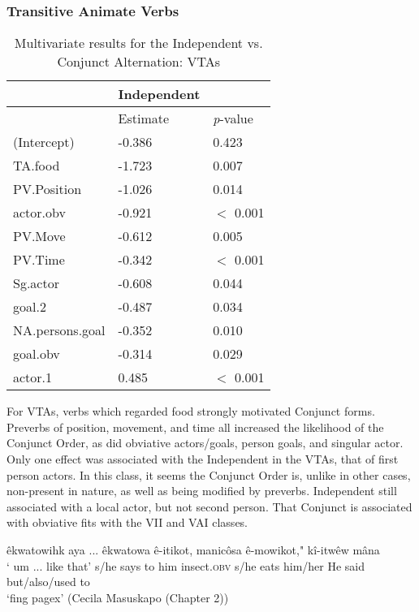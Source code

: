     \subsubsection{Transitive Animate Verbs}
        \begin{table}[H]
            \centering
            \begin{tabular}{lll}
    \toprule
            & \textbf{Independent} & \\
                    \midrule
            & Estimate & \textit{p}-value \\
    \midrule
(Intercept)     & -0.386 & 0.423 \\
TA.food         & -1.723 & 0.007 \\
PV.Position     & -1.026 & 0.014 \\
actor.obv       & -0.921 & $<$ 0.001 \\
PV.Move         & -0.612 & 0.005 \\
PV.Time         & -0.342 & $<$ 0.001\\
Sg.actor        & -0.608 & 0.044 \\
goal.2          & -0.487 & 0.034 \\
NA.persons.goal & -0.352 & 0.010 \\
goal.obv        & -0.314 & 0.029 \\
actor.1         & 0.485  & $<$ 0.001 \\
            \bottomrule
            \end{tabular}
            \caption{
               Multivariate results for the Independent vs. Conjunct Alternation: VTAs \\ \label{tab:taivcmv}
              }
            \end{table}
            
    For VTAs, verbs which regarded food strongly motivated Conjunct forms. Preverbs of position, movement, and time all increased the likelihood of the Conjunct Order, as did obviative actors/goals, person goals, and singular actor. Only one effect was associated with the Independent in the VTAs, that of first person actors. In this class, it seems the Conjunct Order is, unlike in other cases, non-present in nature, as well as being modified by preverbs. Independent still associated with a local actor, but not second person. That Conjunct is associated with obviative fits with the VII and VAI classes.
    
    \begin{exe}
    \ex
    \gll êkwatowihk aya ...  êkwatowa   ê-itikot,              manicôsa             ê-mowikot,"         kî-itwêw mâna\\
         {`}         {um} ... {like that'} { s/he says to him  } {insect.\textsc{obv}} {s/he eats him/her} {He said} but/also/used to \\
    \trans `fing pagex' (Cecila Masuskapo (Chapter 2))
    \label{ivcta1}
    \end{exe}
    
